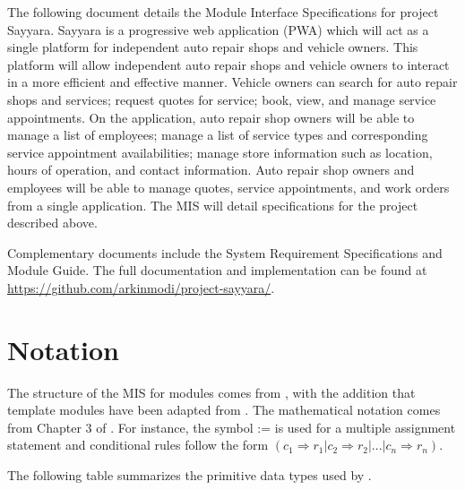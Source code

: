 \documentclass[12pt, titlepage]{article}
\begin{document}
The following document details the Module Interface Specifications for project Sayyara. Sayyara is
a progressive web application (PWA) which will act as a single platform for independent auto repair
shops and vehicle owners. This platform will allow independent auto repair shops and vehicle owners
to interact in a more efficient and effective manner. Vehicle owners can search for auto repair
shops and services; request quotes for service; book, view, and manage service appointments. On the
application, auto repair shop owners will be able to manage a list of employees; manage a list of
service types and corresponding service appointment availabilities; manage store information such
as location, hours of operation, and contact information. Auto repair shop owners and employees
will be able to manage quotes, service appointments, and work orders from a single application. The
MIS will detail specifications for the project described above.

Complementary documents include the System Requirement Specifications and Module Guide. The full
documentation and implementation can be found at
\url{https://github.com/arkinmodi/project-sayyara/}.

\section{Notation}


The structure of the MIS for modules comes from \citet{HoffmanAndStrooper1995}, with the addition
that template modules have been adapted from \cite{GhezziEtAl2003}. The mathematical notation comes
from Chapter 3 of \citet{HoffmanAndStrooper1995}. For instance, the symbol := is used for a
multiple assignment statement and conditional rules follow the form $(c_1 \Rightarrow r_1 | c_2
	\Rightarrow r_2 | ... | c_n \Rightarrow r_n )$.

The following table summarizes the primitive data types used by \progname.
\end{document}
